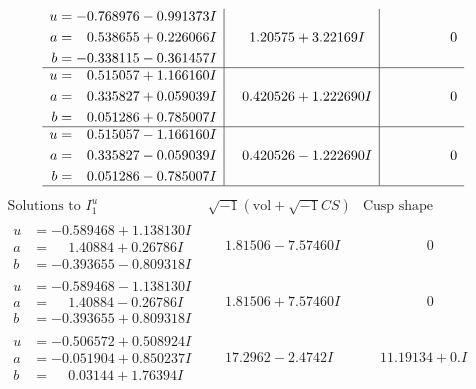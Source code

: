 \documentclass[1p]{elsarticle_modified}
\theoremstyle{definition}
\newcommand{\I}{\sqrt{-1}}
\begin{document}
$$\begin{array}{c|c|c}
\begin{aligned}
u &= -0.768976 - 0.991373 I \\
a &= \phantom{-}0.538655 + 0.226066 I \\
b &= -0.338115 - 0.361457 I\end{aligned}
 & \phantom{-}1.20575 + 3.22169 I & \phantom{-0.000000 } 0 \\ \hline\begin{aligned}
u &= \phantom{-}0.515057 + 1.166160 I \\
a &= \phantom{-}0.335827 + 0.059039 I \\
b &= \phantom{-}0.051286 + 0.785007 I\end{aligned}
 & \phantom{-}0.420526 + 1.222690 I & \phantom{-0.000000 } 0 \\ \hline\begin{aligned}
u &= \phantom{-}0.515057 - 1.166160 I \\
a &= \phantom{-}0.335827 - 0.059039 I \\
b &= \phantom{-}0.051286 - 0.785007 I\end{aligned}
 & \phantom{-}0.420526 - 1.222690 I & \phantom{-0.000000 } 0\\
 \hline 
 \end{array}$$\newpage$$\begin{array}{c|c|c}  
\text{Solutions to }I^u_{1}& \I (\text{vol} + \sqrt{-1}CS) & \text{Cusp shape}\\
 \hline 
\begin{aligned}
u &= -0.589468 + 1.138130 I \\
a &= \phantom{-}1.40884 + 0.26786 I \\
b &= -0.393655 - 0.809318 I\end{aligned}
 & \phantom{-}1.81506 - 7.57460 I & \phantom{-0.000000 } 0 \\ \hline\begin{aligned}
u &= -0.589468 - 1.138130 I \\
a &= \phantom{-}1.40884 - 0.26786 I \\
b &= -0.393655 + 0.809318 I\end{aligned}
 & \phantom{-}1.81506 + 7.57460 I & \phantom{-0.000000 } 0 \\ \hline\begin{aligned}
u &= -0.506572 + 0.508924 I \\
a &= -0.051904 + 0.850237 I \\
b &= \phantom{-}0.03144 + 1.76394 I\end{aligned}
 & \phantom{-}17.2962 - 2.4742 I & \phantom{-}11.19134 + 0. I\phantom{ +0.000000I} \\ \hline\begin{aligned}

\end{aligned}
\end{array}$$
\end{document}

